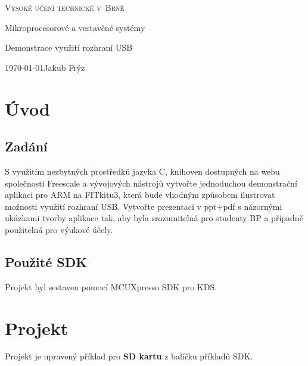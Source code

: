 \documentclass[a4paper, 11pt]{article}
\begin{document}
\begin{titlepage}
\begin{center}

\textsc{{\Huge Vysoké učení technické v~Brně}\\}



{\LARGE Mikroprocesorové a vestavěné systémy}
\medskip

{\Huge Demonstrace využití rozhraní USB}



{\Large \today \hfill Jakub Frýz}

\end{center}
\end{titlepage}

\tableofcontents
\pagebreak

\section{Úvod}

\subsection{Zadání}

S využitím nezbytných prostředků jazyka C, knihoven dostupných na webu společnosti Freescale a vývojových nástrojů vytvořte jednoduchou demonstrační aplikaci pro ARM na FITkitu3, která bude vhodným způsobem ilustrovat možnosti využití rozhraní USB. Vytvořte prezentaci v ppt+pdf s názornými ukázkami tvorby aplikace tak, aby byla srozumitelná pro studenty BP a případně použitelná pro výukové účely.

\subsection{Použité SDK}

Projekt byl sestaven pomocí MCUXpresso SDK pro KDS.

\pagebreak

\section{Projekt}

Projekt je upravený příklad pro \textbf{SD kartu} z balíčku příkladů SDK.
\end{document}
